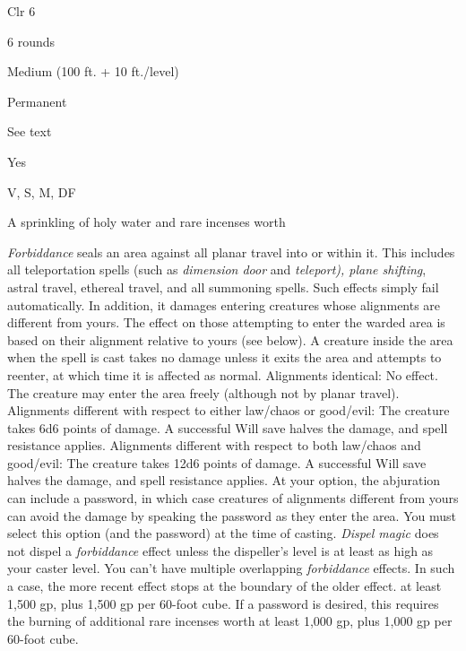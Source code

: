 
\begin{description*}
\item[Level:] Clr 6
\item[Casting Time:] 6 rounds
\item[Range:] Medium (100 ft. + 10 ft./level)
\item[Duration:] Permanent
\item[Saving Throw:] See text
\item[Spell Resistance:] Yes
\item[Components:] V, S, M, DF
\item[Arcane Material Component:] A sprinkling of holy water and rare incenses worth
\end{description*}

\textit{Forbiddance} seals an area against all planar travel into or within it.
This includes all teleportation spells (such as \textit{dimension door} and \textit{teleport),
plane shifting}, astral travel, ethereal travel, and all summoning spells. Such
effects simply fail automatically.
In addition, it damages entering creatures whose alignments are different from
yours. The effect on those attempting to enter the warded area is based on their
alignment relative to yours (see below). A creature inside the area when the spell
is cast takes no damage unless it exits the area and attempts to reenter, at which
time it is affected as normal.
Alignments identical: No effect. The creature may enter the area freely
(although not by planar travel).
Alignments different with respect to either law/chaos or good/evil: The
creature takes 6d6 points of damage. A successful Will save halves the damage,
and spell resistance applies.
Alignments different with respect to both law/chaos and good/evil: The
creature takes 12d6 points of damage. A successful Will save halves the damage,
and spell resistance applies.
At your option, the abjuration can include a password, in which case creatures
of alignments different from yours can avoid the damage by speaking the password
as they enter the area. You must select this option (and the password) at the time
of casting.
\textit{Dispel magic} does not dispel a \textit{forbiddance} effect unless the
dispeller's level is at least as high as your caster level.
You can't have multiple overlapping \textit{forbiddance} effects. In such a case,
the more recent effect stops at the boundary of the older effect.
at least 1,500 gp, plus 1,500 gp per 60-foot cube. If a password is desired, this
requires the burning of additional rare incenses worth at least 1,000 gp, plus
1,000 gp per 60-foot cube.